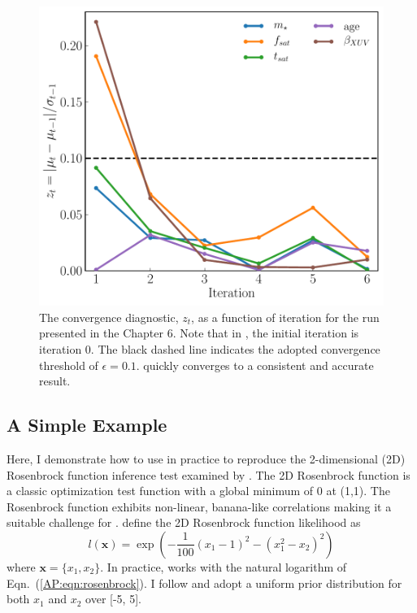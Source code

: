 \begin{figure}
\centering
	\includegraphics[width=\textwidth]{convergence.pdf}
   \caption{The \approxposterior convergence diagnostic, $z_t$, as a function of iteration for the run presented in the Chapter 6. Note that in \approxposterior, the initial iteration is iteration 0. The black dashed line indicates the adopted convergence threshold of $\epsilon = 0.1$. \approxposterior quickly converges to a consistent and accurate result.}%
    \label{AP:fig:convergence}%
\end{figure}

\subsection{A Simple Example} \label{AP:sec:example}

Here, I demonstrate how to use \approxposterior in practice to reproduce the 2-dimensional (2D) Rosenbrock function inference test examined by \citet{Wang2018}. The 2D Rosenbrock function is a classic optimization test function with a global minimum of 0 at (1,1). The Rosenbrock function exhibits non-linear, banana-like correlations making it a suitable challenge for \approxposterior. \citet{Wang2018} define the 2D Rosenbrock function likelihood as
\begin{equation} \label{AP:eqn:rosenbrock}
l(\textbf{x}) = \exp \left( -\frac{1}{100}(x_1 - 1)^2 - (x_1^2 - x_2)^2 \right)
\end{equation}
where $\textbf{x} = \{ x_1, x_2 \}$. In practice, \approxposterior works with the natural logarithm of Eqn.~(\ref{AP:eqn:rosenbrock}). I follow \citet{Wang2018} and adopt a uniform prior distribution for both $x_1$ and $x_2$ over [-5, 5].

